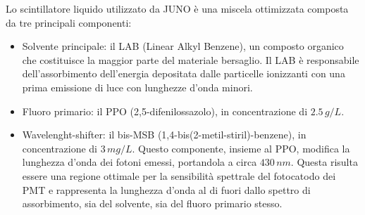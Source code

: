 Lo scintillatore liquido utilizzato da JUNO è una miscela ottimizzata composta da tre principali componenti:
\begin{itemize}
    \item Solvente principale: il LAB (Linear Alkyl Benzene), un composto organico che costituisce la maggior parte del materiale bersaglio. Il LAB è responsabile dell'assorbimento dell'energia depositata dalle particelle ionizzanti con una prima emissione di luce con lunghezze d'onda minori.
    \item Fluoro primario: il PPO (2,5-difenilossazolo), in concentrazione di $2.5\,\unit{g/L}$.
    \item Wavelenght-shifter: il bis-MSB (1,4-bis(2-metil-stiril)-benzene), in concentrazione di $3\,\unit{mg/L}$. Questo componente, insieme al PPO, modifica la lunghezza d'onda dei fotoni emessi, portandola a circa $430\,\unit{nm}$. Questa risulta essere una regione ottimale per la sensibilità spettrale del fotocatodo dei PMT e rappresenta la lunghezza d'onda al di fuori dallo spettro di assorbimento, sia del solvente, sia del fluoro primario stesso.
\end{itemize}
\vspace{0,5cm}


